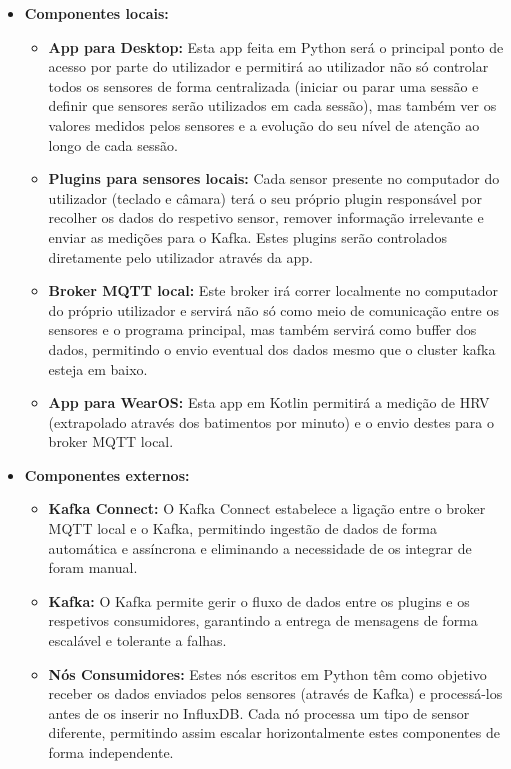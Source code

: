 \begin{itemize}
    \item \textbf{Componentes locais:}
    \begin{itemize}
        \item \textbf{App para Desktop:} Esta app feita em Python será o principal ponto de acesso por parte do utilizador e permitirá ao utilizador não só controlar todos os sensores de forma centralizada (iniciar ou parar uma sessão e definir que sensores serão utilizados em cada sessão), mas também ver os valores medidos pelos sensores e a evolução do seu nível de atenção ao longo de cada sessão.
        \item \textbf{Plugins para sensores locais:} Cada sensor presente no computador do utilizador (teclado e câmara) terá o seu próprio plugin responsável por recolher os dados do respetivo sensor, remover informação irrelevante e enviar as medições para o Kafka. Estes plugins serão controlados diretamente pelo utilizador através da app.
        \item \textbf{Broker MQTT local:} Este broker irá correr localmente no computador do próprio utilizador e servirá não só como meio de comunicação entre os sensores e o programa principal, mas também servirá como buffer dos dados, permitindo o envio eventual dos dados mesmo que o cluster kafka esteja em baixo.
        \item \textbf{App para WearOS:} Esta app em Kotlin permitirá a medição de \ac{HRV} (extrapolado através dos batimentos por minuto) e o envio destes para o broker \ac{MQTT} local.
    \end{itemize}
    \item \textbf{Componentes externos:}
    \begin{itemize}
        \item \textbf{Kafka Connect:} O Kafka Connect estabelece a ligação entre o broker \ac{MQTT} local e o Kafka, permitindo ingestão de dados de forma automática e assíncrona e eliminando a necessidade de os integrar de foram manual.
        \item \textbf{Kafka:} O Kafka permite gerir o fluxo de dados entre os plugins e os respetivos consumidores, garantindo a entrega de mensagens de forma escalável e tolerante a falhas.
        \item \textbf{Nós Consumidores:} Estes nós escritos em Python têm como objetivo receber os dados enviados pelos sensores (através de Kafka) e processá-los antes de os inserir no InfluxDB. Cada nó processa um tipo de sensor diferente, permitindo assim escalar horizontalmente estes componentes de forma independente.

\end{itemize}
\end{itemize}
